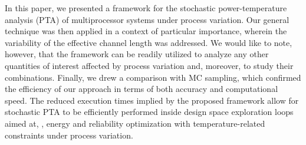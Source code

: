In this paper, we presented a framework for the stochastic power-temperature analysis (PTA) of multiprocessor systems under process variation.
Our general technique was then applied in a context of particular importance, wherein the variability of the effective channel length was addressed.
We would like to note, however, that the framework can be readily utilized to analyze any other quantities of interest affected by process variation and, moreover, to study their combinations.
Finally, we drew a comparison with MC sampling, which confirmed the efficiency of our approach in terms of both accuracy and computational speed.
The reduced execution times implied by the proposed framework allow for stochastic PTA to be efficiently performed inside design space exploration loops aimed at, \eg, energy and reliability optimization with temperature-related constraints under process variation.

